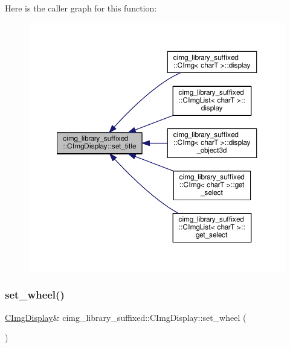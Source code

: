 Here is the caller graph for this function\+:
\nopagebreak
\begin{figure}[H]
\begin{center}
\leavevmode
\includegraphics[width=350pt]{d5/d53/structcimg__library__suffixed_1_1CImgDisplay_ada6a7944d74a9e97e57dc22c936c68ab_icgraph}
\end{center}
\end{figure}
\mbox{\label{structcimg__library__suffixed_1_1CImgDisplay_a4ce1d2c8224658626b37215edfe58ad8}} 
\subsubsection{\texorpdfstring{set\+\_\+wheel()}{set\_wheel()}\hspace{0.1cm}{\footnotesize\ttfamily [1/2]}}
{\footnotesize\ttfamily \hyperlink{structcimg__library__suffixed_1_1CImgDisplay}{C\+Img\+Display}\& cimg\+\_\+library\+\_\+suffixed\+::\+C\+Img\+Display\+::set\+\_\+wheel (\begin{DoxyParamCaption}{ }\end{DoxyParamCaption})\hspace{0.3cm}{\ttfamily [inline]}}




